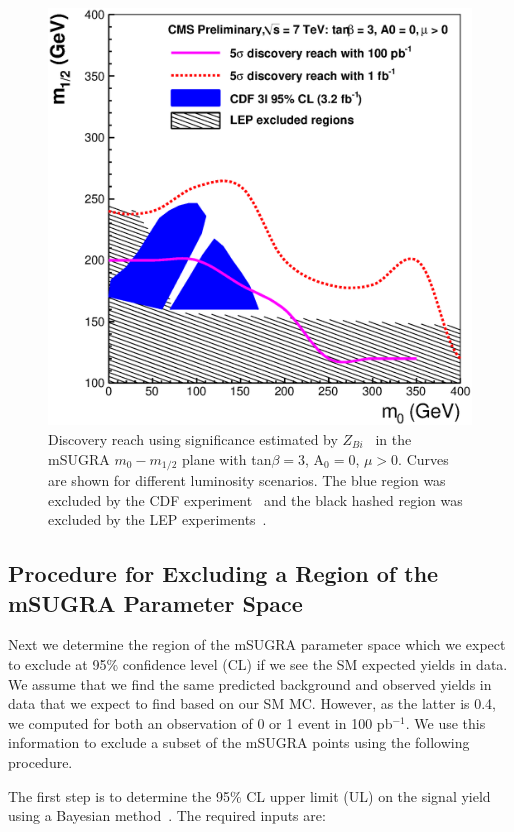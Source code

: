 \vspace{3 mm}
\begin{figure}[htb]
\begin{center}
\includegraphics[width=0.7\linewidth]{figs/massreachss_bi.eps}
\caption{Discovery reach using significance estimated by $Z_{Bi}$~\cite{cite:cousins} 
in the mSUGRA $m_{0}-m_{1/2}$ plane with tan$\beta = 3$, A$_0 = 0$, $\mu > 0$. 
Curves are shown for different luminosity scenarios. The blue region was excluded by 
the CDF experiment~\cite{cdf:recentSusy} and the black hashed region was excluded by the LEP 
experiments~\cite{lep:lepsusyreach}.\label{fig:ss_zbi}}
\end{center}
\end{figure}



\subsection{Procedure for Excluding a Region of the mSUGRA Parameter Space}
\label{sec:exclusion}

Next we  determine the region of  the mSUGRA parameter  space which we
expect  to exclude  at 95\%  confidence level  (CL) if  we see
the SM expected yields in data. 
We  assume  that  we find  the  same
predicted background and observed yields in data  that we expect
to  find based on  our SM  MC. However, as the latter is 0.4, we computed  
for both an observation of 0 or 1 event in 100 pb$^{-1}$. We  use this  
information to  exclude a subset of the mSUGRA points using the following procedure.

The first  step is to  determine the 95\%  CL upper limit (UL)  on the
signal yield using a Bayesian method~\cite{bayes}. The required  inputs 
are: 

